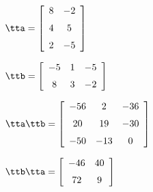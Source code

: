 {$\tta = \left[ \begin {array}{cc} 8&-2\\\noalign{\medskip}4&5
\\\noalign{\medskip}2&-5\end {array} \right] $ 

$\ttb =  \left[ \begin {array}{ccc} -5&1&-5\\\noalign{\medskip}8&3&-2
\end {array} \right]  $}
{$\tta\ttb = \left[ \begin {array}{ccc} -56&2&-36\\\noalign{\medskip}20&19&-30
\\\noalign{\medskip}-50&-13&0\end {array} \right] $

$\ttb\tta = \left[ \begin {array}{cc} -46&40\\\noalign{\medskip}72&9\end {array} \right]  $}



  

 

